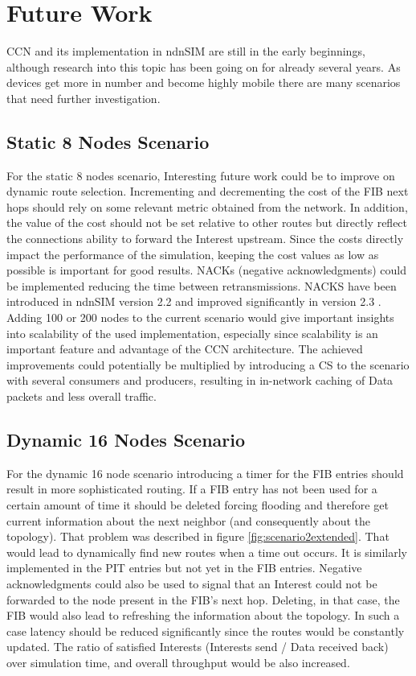 \section{Future Work}

CCN and its implementation in ndnSIM are still in the early beginnings, although research into this topic has been going on for already several years. As devices get more in number and become highly mobile there are many scenarios that need further investigation.

\subsection{Static 8 Nodes Scenario}

For the static 8 nodes scenario, Interesting future work could be to improve on dynamic route selection. Incrementing and decrementing the cost of the FIB next hops should rely on some relevant metric obtained from the network. In addition, the value of the cost should not be set relative to other routes but directly reflect the connections ability to forward the Interest upstream. Since the costs directly impact the performance of the simulation, keeping the cost values as low as possible is important for good results. NACKs (negative acknowledgments) could be implemented reducing the time between retransmissions. NACKS have been introduced in ndnSIM version 2.2 and improved significantly in version 2.3 \cite{ndnSIMreleaseNotes}. Adding 100 or 200 nodes to the current scenario would give important insights into scalability of the used implementation, especially since scalability is an important feature and advantage of the CCN architecture. The achieved improvements could potentially be multiplied by introducing a CS to the scenario with several consumers and producers, resulting in in-network caching of Data packets and less overall traffic.

\subsection{Dynamic 16 Nodes Scenario}

For the dynamic 16 node scenario introducing a timer for the FIB entries should result in more sophisticated routing. If a FIB entry has not been used for a certain amount of time it should be deleted forcing flooding and therefore get current information about the next neighbor (and consequently about the topology). That problem was described in figure \ref{fig:scenario2extended}. That would lead to dynamically find new routes when a time out occurs. It is similarly implemented in the PIT entries but not yet in the FIB entries. Negative acknowledgments could also be used to signal that an Interest could not be forwarded to the node present in the FIB's next hop. Deleting, in that case, the FIB would also lead to refreshing the information about the topology. In such a case latency should be reduced significantly since the routes would be constantly updated. The ratio of satisfied Interests (Interests send / Data received back) over simulation time, and overall throughput would be also increased.






